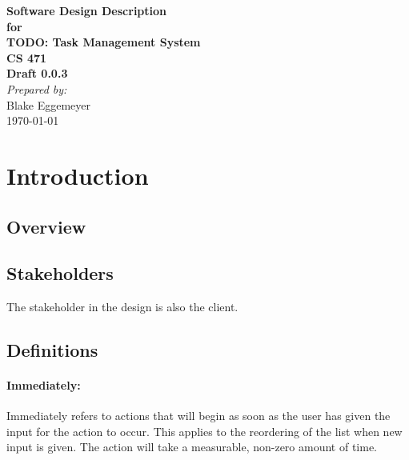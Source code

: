 \documentclass[12pt,a4paper]{article}
\begin{document}
\begin{titlepage}
\begin{flushright} 
{\LARGE \bfseries Software Design Description}\\[1.2cm]
{\large \bfseries for}\\[1.2cm]
{\huge \bfseries TODO: Task Management System}\\[1.2cm]
{\large \bfseries CS 471}\\
\vfill
{\large \bfseries Draft 0.0.3}\\[2cm]
\emph{Prepared by:} \\
Blake Eggemeyer \\ [3cm]
{\large \today}
\end{flushright}
\end{titlepage}
\setcounter{tocdepth}{3}
\setcounter{secnumdepth}{4}
\tableofcontents
\newpage

\section{Introduction}

\subsection{Overview}

\subsection{Stakeholders}
The stakeholder in the design is also the client.

\subsection{}

\subsection{Definitions}
\setcounter{paragraph}{0}
\setcounter{subsubsection}{1}
\paragraph{Immediately:} Immediately refers to actions that will begin as soon as the user has given the input for the action to occur.  This applies to the reordering of the list when new input is given.  The action will take a measurable, non-zero amount of time.
\end{document}
